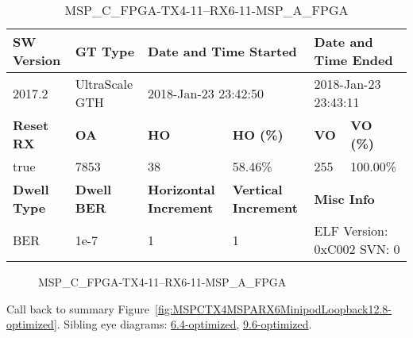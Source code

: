 \begin{table}[h]
\centering
\caption{MSP\_C\_FPGA-TX4-11--RX6-11-MSP\_A\_FPGA}
\label{tab:MSPCFPGATX411RX611MSPAFPGA12.8-optimized}
\begin{tabular}{@{}|l|l|l|l|l|l|@{}}
\toprule
\textbf{SW Version}                & \textbf{GT Type}   & \multicolumn{2}{l|}{\textbf{Date and Time Started}}            & \multicolumn{2}{l|}{\textbf{Date and Time Ended}}        \\ \midrule
2017.2                       & UltraScale GTH          & \multicolumn{2}{l|}{2018-Jan-23 23:42:50}                   & \multicolumn{2}{l|}{2018-Jan-23 23:43:11}               \\ \midrule
\textbf{Reset RX}                  & \textbf{OA} & \textbf{HO}   & \textbf{HO (\%)} & \textbf{VO} & \textbf{VO (\%)} \\ \midrule
true & 7853        & 38          & 58.46\%        & 255        & 100.00\%       \\ \midrule
\textbf{Dwell Type}                & \textbf{Dwell BER} & \textbf{Horizontal Increment} & \textbf{Vertical Increment}    & \multicolumn{2}{l|}{\textbf{Misc Info}}                  \\ \midrule
BER                            & 1e-7        & 1        & 1           & \multicolumn{2}{l|}{ELF Version: 0xC002 SVN: 0}                         \\ \bottomrule
\end{tabular}
\end{table}

\begin{figure}[h]
\caption{MSP\_C\_FPGA-TX4-11--RX6-11-MSP\_A\_FPGA} \label{fig:MSPCFPGATX411RX611MSPAFPGA12.8-optimized}
\end{figure}

Call back to summary Figure~\ref{fig:MSPCTX4MSPARX6MinipodLoopback12.8-optimized}.
Sibling eye diagrams: \hyperref[sec:MSPCFPGATX411RX611MSPAFPGA6.4-optimized]{6.4-optimized}, \hyperref[sec:MSPCFPGATX411RX611MSPAFPGA9.6-optimized]{9.6-optimized}.

\clearpage
\newpage

